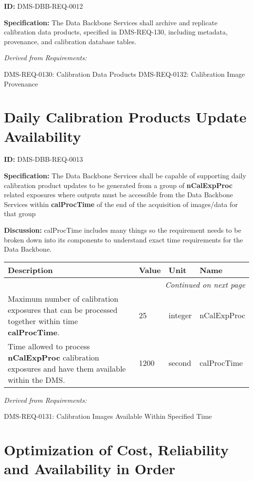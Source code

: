 \documentclass[SE,toc,lsstdraft]{lsstdoc}
\makeatletter
\newcommand{\paramname}[1]{\hspace{0pt}#1}
\newcommand{\unitname}[1]{\hspace{0pt}#1}
\newenvironment{parameters}[0]{%
\setlength\LTleft{0pt}
\setlength\LTright{\fill}
\begin{small}
\begin{longtable}[]{|p{0.49\textwidth}|l|p{0.6in}|p{1.70in}@{}|}

\hline \textbf{Description} & \textbf{Value} & \textbf{Unit} & \textbf{Name} \\ \hline
\endhead

\hline \multicolumn{4}{r}{\emph{Continued on next page}} \\
\endfoot

\hline\hline
\endlastfoot
}{%
\hline
\end{longtable}
\end{small}
}
\makeatother
\begin{document}
\label{DMS-DBB-REQ-0012}
\textbf{ID:} DMS-DBB-REQ-0012

\textbf{Specification:}
The Data Backbone Services shall archive and replicate calibration data products, specified in DMS-REQ-130, including metadata, provenance, and calibration database tables.

\emph{Derived from Requirements:}

DMS-REQ-0130:
Calibration Data Products \newline
DMS-REQ-0132:
Calibration Image Provenance \newline

\section{Daily Calibration Products Update Availability}

\label{DMS-DBB-REQ-0013}
\textbf{ID:} DMS-DBB-REQ-0013

\textbf{Specification:}
The Data Backbone Services shall be capable of supporting daily calibration product updates to be generated from a group of \textbf{nCalExpProc} related exposures where outputs must be accessible from the Data Backbone Services within \textbf{calProcTime} of the end of the acquisition of images/data for that group

\textbf{Discussion:}
calProcTime includes many things so the requirement needs to be broken down into its components to understand exact time requirements for the Data Backbone.

\begin{parameters}

Maximum number of calibration exposures that can be processed together within time \textbf{calProcTime}.

&
25
&
\unitname{%
integer
}
&
\paramname{%
nCalExpProc
} \\\hline
Time allowed to process \textbf{nCalExpProc} calibration exposures and have them available within the DMS.
&
1200
&
\unitname{%
second
}
&
\paramname{%
calProcTime
} \\\hline
\end{parameters}

\emph{Derived from Requirements:}

DMS-REQ-0131:
Calibration Images Available Within Specified Time \newline

\section{Optimization of Cost, Reliability and Availability in Order}
\end{document}
